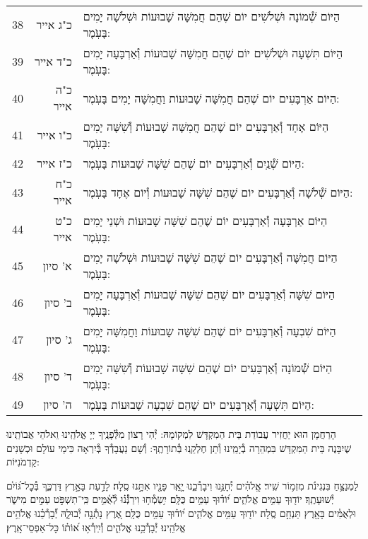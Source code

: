 \documentclass[twoside, openany, parskip=half, 11pt]{book}
\begin{document}
\begin{scriptsize}
\begin{longtable}{ l | r | p{} }
38 & כ"ג אייר & הַיּוֹם שְׁ֯מוֹנָה וּשְׁלֹשִׁים יוֹם שֶׁהֵם חֲמִשָּׁה שָׁבוּעוֹת וּשְׁלֹשָׁה יָמִים בָּעֹֽמֶר: \\
39 & כ"ד אייר & הַיּוֹם תִּשְׁעָה וּשְׁלֹשִׁים יוֹם שֶׁהֵם חֲמִשָּׁה שָׁבוּעוֹת וְ֯אַרְבָּעָה יָמִים בָּעֹֽמֶר: \\
40 & כ"ה אייר & הַיּוֹם אַרְבָּעִים יוֹם שֶׁהֵם חֲמִשָּׁה שָׁבוּעוֹת וַחֲמִשָּׁה יָמִים בָּעֹֽמֶר: \\
41 & כ"ו אייר & הַיּוֹם אֶחָד וְ֯אַרְבָּעִים יוֹם שֶׁהֵם חֲמִשָּׁה שָׁבוּעוֹת וְ֯שִׁשָּׁה יָמִים בָּעֹֽמֶר: \\
42 & כ"ז אייר & הַיּוֹם שְׁ֯נַֽיִם וְ֯אַרְבָּעִים יוֹם שֶׁהֵם שִׁשָּׁה שָׁבוּעוֹת בָּעֹֽמֶר: \\
43 & כ"ח אייר & הַיּוֹם שְׁ֯לֹשָׁה וְ֯אַרְבָּעִים יוֹם שֶׁהֵם שִׁשָּׁה שָׁבוּעוֹת וְ֯יוֹם אֶחָד בָּעֹֽמֶר: \\
44 & כ"ט אייר & הַיּוֹם אַרְבָּעָה וְ֯אַרְבָּעִים יוֹם שֶׁהֵם שִׁשָּׁה שָׁבוּעוֹת וּשְׁנֵי יָמִים בָּעֹֽמֶר: \\
45 & א' סיון & הַיּוֹם חֲמִשָּׁה וְ֯אַרְבָּעִים יוֹם שֶׁהֵם שִׁשָּׁה שָׁבוּעוֹת וּשְׁלֹשָׁה יָמִים בָּעֹֽמֶר: \\
46 & ב' סיון & הַיּוֹם שִׁשָּׁה וְ֯אַרְבָּעִים יוֹם שֶׁהֵם שִׁשָּׁה שָׁבוּעוֹת וְ֯אַרְבָּעָה יָמִים בָּעֹֽמֶר: \\
47 & ג' סיון & הַיּוֹם שִׁבְעָה וְ֯אַרְבָּעִים יוֹם שֶׁהֵם שִׁשָּׁה שָבוּעוֹת וַחֲמִשָּׁה יָמִים בָּעֹֽמֶר: \\
48 & ד' סיון & הַיּוֹם שְׁ֯מוֹנָה וְ֯אַרְבָּעִים יוֹם שֶׁהֵם שִׁשָּׁה שָׁבוּעוֹת וְ֯שִׁשָּׁה יָמִים בָּעֹֽמֶר: \\
49 & ה' סיון & הַיּוֹם תִּשְׁעָה וְ֯אַרְבָּעִים יוֹם שֶׁהֵם שִׁבְעָה שָׁבוּעוֹת בָּעֹֽמֶר:
\end{longtable}
\end{scriptsize}



הָרַחֲמָן הוּא יַחֲזִיר עֲבוֹדַת בֵּית הַמִקְדָּשׁ לִמְקוֹמָהּ:
יְ֯הִי רָצוֹן מִלְּ֯פָנֶֽיךָ יְיָ אֱלֹהֵֽינוּ וֵאלֹהֵי אֲבוֹתֵֽינוּ שֶׁיִבָּנֶה בֵּית הַמִּקְדָּשׁ בִּמְהֵרָה בְ֯יָמֵֽינוּ וְ֯תֵן חֶלְקֵֽנוּ בְּ֯תוֹרָתֶֽךָ: וְ֯שָׁם נַעֲבָדְ֯ךָ בְּ֯יִרְאָה כִּימֵי עוֹלָם וּכְשָׁנִים קַדְמֹנִיּוֹת:


לַמְנַצֵּ֥חַ בִּנְגִינֹ֗ת מִזְמ֥וֹר שִֽׁיר׃ אֱֽלֹהִ֗ים יְ֯חָנֵּ֥נוּ וִיבָרְ֯כֵ֑נוּ יָ֤אֵֽר פָּנָ֖יו אִתָּ֣נוּ סֶֽלָה׃ לָדַ֣עַת בָּאָ֣רֶץ דַּרְכֶּ֑ךָ בְּ֯כׇל־גּ֝וֹיִ֗ם יְ֯שׁוּעָתֶֽךָ׃ יוֹד֖וּךָ עַמִּ֥ים אֱלֹהִ֑ים י֝וֹד֗וּךָ עַמִּ֥ים כֻּלָּֽם׃ יִ֥שְׂמְ֯ח֥וּ וִירַנְּ֯֯נ֗וּ לְ֯אֻ֫מִּ֥ים כִּֽי־תִשְׁפֹּ֣ט עַמִּ֣ים מִישֹׁ֑ר וּלְאֻמִּ֓ים בָּאָ֖רֶץ תַּנְחֵ֣ם סֶֽלָה׃ יוֹד֖וּךָ עַמִּ֥ים אֱלֹהִ֑ים י֝וֹד֗וּךָ עַמִּ֥ים כֻּלָּֽם׃ אֶ֭רֶץ נָתְ֯נָ֣ה יְ֯בוּלָ֑הּ יְ֯֝בָרְ֯כֵ֗נוּ אֱלֹהִ֥ים
אֱלֹהֵֽינוּ׃ יְ֯בָרְ֯כֵ֥נוּ אֱלֹהִ֑ים וְ֯יִֽירְ֯א֥וּ א֝וֹת֗וֹ כָּל־אַפְסֵי־אָֽרֶץ׃
\end{document}
